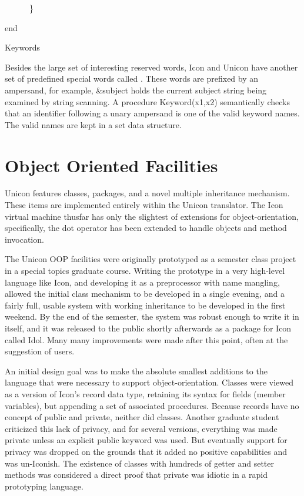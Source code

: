 {\ttfamily\mdseries
\ \ \ \ \ \ \}}

{\ttfamily\mdseries
end}

{\sffamily
Keywords }


Besides the large set of interesting reserved words, Icon and Unicon
have another set of predefined special words called
. These words are prefixed by an
ampersand, for example, \&subject holds the current
{\textquotedbl}subject{\textquotedbl} string being examined by string
scanning. A procedure Keyword(x1,x2) semantically checks that an
identifier following a unary ampersand is one of the valid keyword
names. The valid names are kept in a set data structure.


\section{Object Oriented Facilities}

Unicon features classes, packages, and a novel multiple inheritance
mechanism. These items are implemented entirely within the Unicon
translator. The Icon virtual machine thusfar has only the slightest of
extensions for object-orientation, specifically, the dot operator has
been extended to handle objects and method invocation.

The Unicon OOP facilities were originally prototyped as a semester
class project in a {\textquotedbl}special topics{\textquotedbl}
graduate course. Writing the prototype in a very high-level language
like Icon, and developing it as a preprocessor with name mangling,
allowed the initial class mechanism to be developed in a single
evening, and a fairly full, usable system with working inheritance to
be developed in the first weekend. By the end of the semester, the
system was robust enough to write it in itself, and it was released to
the public shortly afterwards as a package for Icon called
{\textquotedbl}Idol{\textquotedbl}. Many many improvements were made
after this point, often at the suggestion of users.

An initial design goal was to make the absolute smallest additions to
the language that were necessary to support
object-orientation. Classes were viewed as a version of Icon's record
data type, retaining its syntax for fields (member variables), but
appending a set of associated procedures. Because records have no
concept of public and private, neither did classes. Another graduate
student criticized this lack of privacy, and for several versions,
everything was made private unless an explicit public keyword was
used. But eventually support for privacy was dropped on the grounds
that it added no positive capabilities and was un-Iconish. The
existence of classes with hundreds of
{\textquotedbl}getter{\textquotedbl} and
{\textquotedbl}setter{\textquotedbl} methods was considered a direct
proof that {\textquotedbl}private{\textquotedbl} was idiotic in a
rapid prototyping language.

